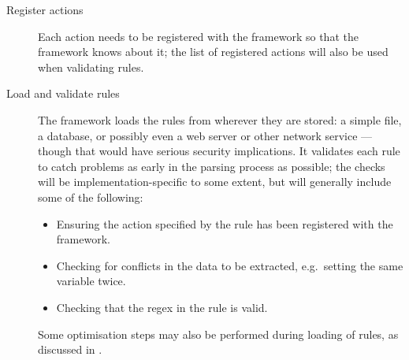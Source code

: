 \begin{description}

    \item [Register actions]  Each action needs to be registered with the
        framework so that the framework knows about it; the list of
        registered actions will also be used when validating rules.

    \item [Load and validate rules]  The framework loads the rules from
        wherever they are stored: a simple file, a database, or possibly
        even a web server or other network service --- though that would
        have serious security implications.  It validates each rule to
        catch problems as early in the parsing process as possible; the
        checks will be implementation-specific to some extent, but will
        generally include some of the following:

        \begin{itemize}

            \squeezeitems{}

            \item Ensuring the action specified by the rule has been
                registered with the framework.

            \item Checking for conflicts in the data to be extracted, e.g.\
                setting the same variable twice.

            \item Checking that the regex in the rule is valid.

        \end{itemize}

        Some optimisation steps may also be performed during loading of
        rules, as discussed in \sectionref{parser efficiency}.


\end{description}
